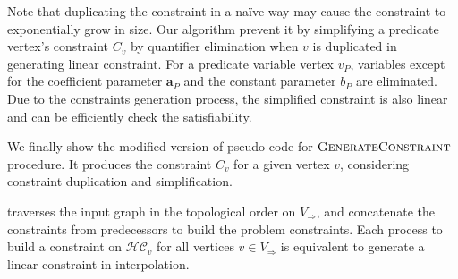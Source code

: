 \documentclass[a4paper,12pt]{article}
\begin{document}
Note that duplicating the constraint in a na\"{i}ve way may cause the
constraint to exponentially grow in size.  Our algorithm prevent it by
simplifying a predicate vertex's constraint $C_v$ by quantifier
elimination when $v$ is duplicated in generating linear constraint.
For a predicate variable vertex $v_P$, variables except for the
coefficient parameter $\mathbf{a}_P$ and the constant parameter $b_P$
are eliminated.  Due to the constraints generation process, the
simplified constraint is also linear and can be efficiently check the
satisfiability.

We finally show the modified version of pseudo-code for $\mbox{\sc GenerateConstraint}$
procedure.  It produces the constraint $C_v$ for a given vertex $v$,
considering constraint duplication and simplification.

\begin{algorithm}
\caption{$ \genConstr (G, v, V_\star) $}\label{alg:genConstr}
\begin{algorithmic}
    \ELSE
    \ENDIF
  \ENDFOR
\ENDFOR
\end{algorithmic}
\end{algorithm}


traverses the input graph in the topological order on
$V_\Rightarrow$, and concatenate the constraints from predecessors to
build the problem constraints.  Each process to build a constraint on
$\mathcal{HC}_v$ for all vertices $v \in V_\Rightarrow$ is equivalent
to generate a linear constraint in interpolation.




\end{document}
